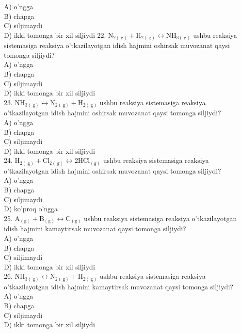 A) o'ngga\\
B) chapga\\
C) siljimaydi\\
D) ikki tomonga bir xil siljiydi
22. $\mathrm{N}_{2(\mathrm{~g})}+\mathrm{H}_{2(\mathrm{~g})} \leftrightarrow \mathrm{NH}_{3(\mathrm{~g})}$ ushbu reaksiya sistemasiga reaksiya o'tkazilayotgan idish hajmini oshirsak muvozanat qaysi tomonga siljiydi?\\
A) o'ngga\\
B) chapga\\
C) siljimaydi\\
D) ikki tomonga bir xil siljiydi\\
23. $\mathrm{NH}_{3(\mathrm{~g})} \leftrightarrow \mathrm{N}_{2(\mathrm{~g})}+\mathrm{H}_{2(\mathrm{~g})}$ ushbu reaksiya sistemasiga reaksiya o'tkazilayotgan idish hajmini oshirsak muvozanat qaysi tomonga siljiydi?\\
A) o'ngga\\
B) chapga\\
C) siljimaydi\\
D) ikki tomonga bir xil siljiydi\\
24. $\mathrm{H}_{2(\mathrm{~g})}+\mathrm{Cl}_{2(\mathrm{~g})} \leftrightarrow 2 \mathrm{HCl}_{(\mathrm{g})}$ ushbu reaksiya sistemasiga reaksiya o'tkazilayotgan idish hajmini oshirsak muvozanat qaysi tomonga siljiydi?\\
A) o'ngga\\
B) chapga\\
C) siljimaydi\\
D) ko'proq o'ngga\\
25. $\mathrm{A}_{(\mathrm{g})}+\mathrm{B}_{(\mathrm{g})} \leftrightarrow \mathrm{C}_{(\mathrm{g})}$ ushbu reaksiya sistemasiga reaksiya o'tkazilayotgan idish hajmini kamaytirsak muvozanat qaysi tomonga siljiydi?\\
A) o'ngga\\
B) chapga\\
C) siljimaydi\\
D) ikki tomonga bir xil siljiydi\\
26. $\mathrm{NH}_{3(\mathrm{~g})} \leftrightarrow \mathrm{N}_{2(\mathrm{~g})}+\mathrm{H}_{2(\mathrm{~g})}$ ushbu reaksiya sistemasiga reaksiya o'tkazilayotgan idish hajmini kamaytirsak muvozanat qaysi tomonga siljiydi?\\
A) o'ngga\\
B) chapga\\
C) siljimaydi\\
D) ikki tomonga bir xil siljiydi\\
